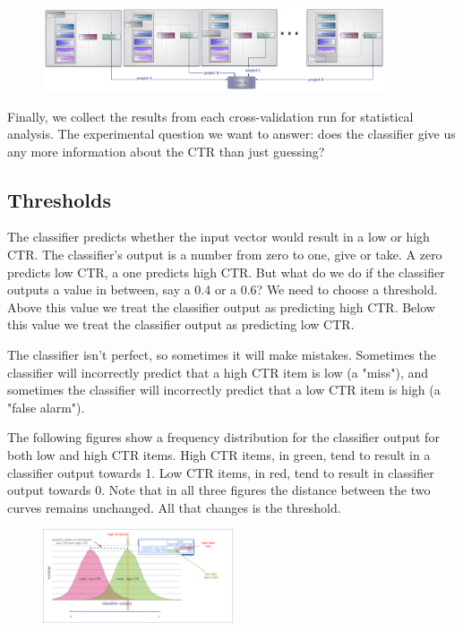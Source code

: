 \begin{figure}
\centering
\includegraphics[width=0.9\textwidth]{img/testclass/2.jpg}
\caption{
}
\label{Fig.1}
\end{figure}

Finally, we collect the results from each cross-validation run for statistical analysis. The experimental question we want to answer: does the classifier give us any more information about the CTR than just guessing?

\subsection*{Thresholds}
The classifier predicts whether the input vector would result in a low or high CTR. The classifier’s output is a number from zero to one, give or take. A zero predicts low CTR, a one predicts high CTR. But what do we do if the classifier outputs a value in between, say a 0.4 or a 0.6? We need to choose a threshold. Above this value we treat the classifier output as predicting high CTR. Below this value we treat the classifier output as predicting low CTR.

The classifier isn’t perfect, so sometimes it will make mistakes. Sometimes the classifier will incorrectly predict that a high CTR item is low (a "miss"), and sometimes the classifier will incorrectly predict that a low CTR item is high (a "false alarm").

The following figures show a frequency distribution for the classifier output for both low and high CTR items. High CTR items, in green, tend to result in a classifier output towards 1. Low CTR items, in red, tend to result in classifier output towards 0. Note that in all three figures the distance between the two curves remains unchanged. All that changes is the threshold.

\begin{figure}
\centering
\includegraphics[width=0.5\textwidth]{img/testclass/3.png}
\caption{
}
\label{Fig.1}
\end{figure}

